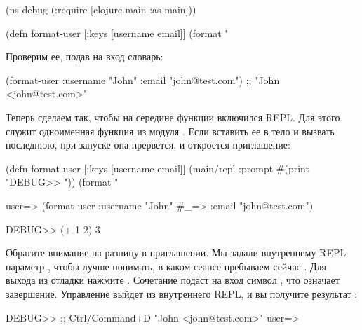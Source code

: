 \begin{english}
  \begin{clojure}
(ns debug
  (:require [clojure.main :as main]))

(defn format-user
  [{:keys [username email]}]
  (format "%
  \end{clojure}
\end{english}

Проверим ее, подав на вход словарь:

\begin{english}
  \begin{clojure}
(format-user {:username "John"
              :email "john@test.com"})
;; "John <john@test.com>"
  \end{clojure}
\end{english}

Теперь сделаем так, чтобы на середине функции включился REPL. Для этого служит одноименная функция из модуля . Если вставить ее в тело  и вызвать последнюю, при запуске она прервется, и откроется приглашение:

\begin{english}
  \begin{clojure/lines}
(defn format-user
  [{:keys [username email]}]
  (main/repl :prompt #(print "DEBUG>> "))
  (format "%
  \end{clojure/lines}
\end{english}

\begin{english}
  \begin{text}
user=> (format-user {:username "John"
  #_=>               :email "john@test.com"})

DEBUG>> (+ 1 2)
3
  \end{text}
\end{english}

Обратите внимание на разницу в приглашении. Мы задали внутреннему REPL параметр , чтобы лучше понимать, в каком сеансе пребываем сейчас . Для выхода из отладки нажмите . Сочетание подаст на вход символ , что означает завершение. Управление выйдет из внутреннего REPL, и вы получите результат :

\begin{english}
  \begin{text}
DEBUG>> ;; Ctrl/Command+D
"John <john@test.com>"
user=>
  \end{text}
\end{english}

